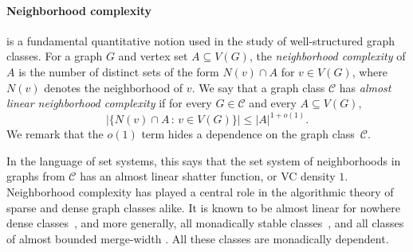 \documentclass[11pt]{article}
\theoremstyle{definition}
\newcommand{\CC}{{\mathscr C}}
\newcommand{\Oh}{\mathcal{O}}
\renewcommand{\leq}{\leqslant}
\newcommand{\set}[1]{\{#1\}}
\begin{document}

\paragraph{Neighborhood complexity\!\!} is a 
fundamental quantitative notion used in the study of well-structured graph classes. For a graph $G$ and 
vertex set $A\subseteq V(G)$, the \emph{neighborhood complexity} of $A$ is the number of distinct sets of the form $N(v)\cap A$ for $v\in V(G)$, where $N(v)$ denotes the neighborhood of $v$.
We say that a graph class $\CC$ has \emph{almost linear neighborhood complexity} if for every $G\in\CC$ and every $A\subseteq V(G)$,
\[\Big|\set{N(v)\cap A\,:\, v\in V(G)}\Big| \leq |A|^{1+o(1)}.\]
We remark that the $o(1)$ term hides a dependence on the graph class~$\CC$.

In the language of set systems, this says that the set system of neighborhoods in graphs from $\CC$ has an almost linear shatter function, or VC density $1$.
Neighborhood complexity has played a central role in the algorithmic theory of sparse and dense graph classes alike. It is known to be almost linear for nowhere dense classes~\cite{EickmeyerGKKPRS17}, %
and more generally, all monadically stable classes~\cite{stable_MC}, and   all classes of almost bounded merge-width \cite{bonamy2025chiboundednessneighbourhoodcomplexitybounded}.  All these classes are monadically dependent.
\end{document}
